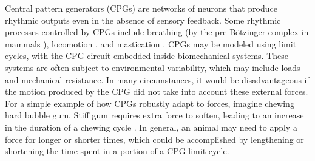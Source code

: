 \documentclass[12pt]{article}
\begin{document}
 Central pattern generators (CPGs) are networks of neurons that produce rhythmic outputs even in the absence of sensory feedback.  Some rhythmic processes controlled by CPGs include breathing (by the pre-B\"{o}tzinger complex in mammals \cite{Butera+Rinzel+Smith:1999a:JNPhys,Butera+Rinzel+Smith:1999b:JNPhys}), locomotion \cite{CohenErmentroutKiemelKopellSigvardtWilliams:1992:TrendsNsci,SpardyEtAlRubin2011a,SpardyEtAlRubin2011b}, and mastication \cite{LundKolta:2006}.  CPGs may be modeled using limit cycles, with the CPG circuit embedded inside biomechanical systems.  These systems are often subject to environmental variability, which may include loads and mechanical resistance.  In many circumstances, it would be disadvantageous if the motion produced by the CPG did not take into account these external forces.  For a simple example of how CPGs robustly adapt to forces, imagine chewing hard bubble gum.  Stiff gum requires extra force to soften, leading to an increase in the duration of a chewing cycle \cite{
Plesh1986}.  
 In general, an animal may need to apply a force for longer or shorter times, which could be accomplished by lengthening or shortening the time spent in a portion of a CPG limit cycle.  %
 
 
\end{document}
